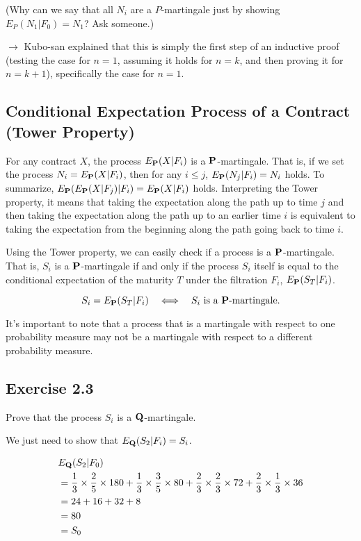 \documentclass[uplatex,a4j,12pt,dvipdfmx]{jsarticle}
\begin{document}
(Why can we say that all $N_i$ are a $P$-martingale just by showing $E_P( N_1 | F_0 ) = N_1$? Ask someone.)

$\longrightarrow$ Kubo-san explained that this is simply the first step of an inductive proof (testing the case for $n=1$, assuming it holds for $n=k$, and then proving it for $n=k+1$), specifically the case for $n=1$.

\subsection{Conditional Expectation Process of a Contract (Tower Property)}
For any contract $X$, the process $E_{\bf P}(X|F_i)$ is a ${\bf P}$-martingale. That is, if we set the process $N_i = E_{\bf P} (X|F_i)$, then for any $i \le j$, $E_{\bf P}( N_j | F_i ) = N_i$ holds. To summarize, $E_{\bf P}( E_{\bf P}( X | F_j ) | F_i ) = E_{\bf P}( X | F_i )$ holds.
Interpreting the Tower property, it means that taking the expectation along the path up to time $j$ and then taking the expectation along the path up to an earlier time $i$ is equivalent to taking the expectation from the beginning along the path going back to time $i$.

Using the Tower property, we can easily check if a process is a ${\bf P}$-martingale. That is, $S_{i}$ is a ${\bf P}$-martingale if and only if the process $S_{i}$ itself is equal to the conditional expectation of the maturity $T$ under the filtration $F_{i}$, $E_{\bf P}( S_{T} | F_i )$.

\[S_{i} = E_{\bf P}( S_{T} | F_i ) \quad \Longleftrightarrow \quad S_{i} \text{ is a } {\bf P}\text{-martingale.}\]

It's important to note that a process that is a martingale with respect to one probability measure may not be a martingale with respect to a different probability measure.

\subsection{Exercise 2.3}
Prove that the process $S_{i}$ is a ${\bf Q}$-martingale.

We just need to show that $E_{\bf Q}( S_{2} | F_i ) = S_{i}$.

\begin{align*}
& E_{\bf Q}( S_{2} | F_0 ) \\
&= \frac{1}{3} \times \frac{2}{5} \times 180 + \frac{1}{3} \times \frac{3}{5} \times 80 + \frac{2}{3} \times \frac{2}{3} \times 72 + \frac{2}{3} \times \frac{1}{3} \times 36 \\
&= 24 + 16 + 32 + 8 \\
&= 80 \\
&= S_{0}
\end{align*}
\end{document}
